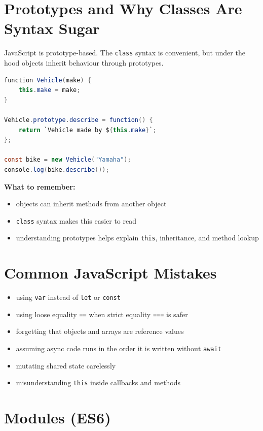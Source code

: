 \documentclass[12pt, a4paper, oneside]{book}
\begin{document}
\section{Prototypes and Why Classes Are Syntax Sugar}

JavaScript is prototype-based. The \texttt{class} syntax is convenient, but under the hood objects inherit behaviour through prototypes.

\begin{lstlisting}[language=Java, caption={Prototype intuition}]
function Vehicle(make) {
    this.make = make;
}

Vehicle.prototype.describe = function() {
    return `Vehicle made by ${this.make}`;
};

const bike = new Vehicle("Yamaha");
console.log(bike.describe());
\end{lstlisting}

\textbf{What to remember:}
\begin{itemize}[leftmargin=2em]
    \item objects can inherit methods from another object
    \item \texttt{class} syntax makes this easier to read
    \item understanding prototypes helps explain \texttt{this}, inheritance, and method lookup
\end{itemize}

\section{Common JavaScript Mistakes}

\begin{itemize}[leftmargin=2em]
    \item using \texttt{var} instead of \texttt{let} or \texttt{const}
    \item using loose equality \texttt{==} when strict equality \texttt{===} is safer
    \item forgetting that objects and arrays are reference values
    \item assuming async code runs in the order it is written without \texttt{await}
    \item mutating shared state carelessly
    \item misunderstanding \texttt{this} inside callbacks and methods
\end{itemize}

\section{Modules (ES6)}
\end{document}
